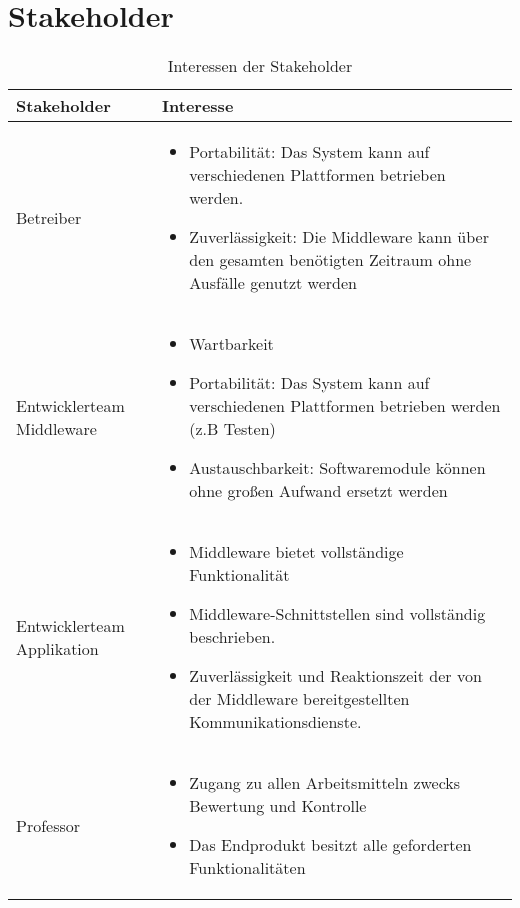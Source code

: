 \section{Stakeholder}
\begin{table}[h!]
	\caption{Interessen der Stakeholder}
	\label{tab:stakeholder}
	\centering
	\begin{tabular}{|p{2.5cm}|p{10cm}|}
		\hline
		\textbf{Stakeholder} & \textbf{Interesse}  \\
		\hline
		Betreiber 
		&\parbox{10cm}{\begin{itemize}
				\item Portabilität: Das System kann auf verschiedenen Plattformen betrieben werden.
				\item Zuverlässigkeit: Die Middleware kann über den gesamten benötigten Zeitraum ohne Ausfälle genutzt werden
		\end{itemize}}
		\\
		\hline
		Entwicklerteam Middleware
		&\parbox{10cm}{ \begin{itemize}
				\item Wartbarkeit
				\item Portabilität: Das System kann auf verschiedenen Plattformen betrieben werden (z.B Testen)
				\item Austauschbarkeit: Softwaremodule können ohne großen Aufwand ersetzt werden
		\end{itemize}}
		\\
		\hline
		Entwicklerteam Applikation
		&\parbox{10cm}{ \begin{itemize}
				\item Middleware bietet vollständige Funktionalität
				\item Middleware-Schnittstellen sind vollständig beschrieben.
				\item Zuverlässigkeit und Reaktionszeit der von der Middleware bereitgestellten Kommunikationsdienste.
		\end{itemize}}
		\\
		\hline
		
		Professor & \parbox{10cm}{\begin{itemize}
				\item Zugang zu allen Arbeitsmitteln zwecks Bewertung und Kontrolle
				\item Das Endprodukt besitzt alle geforderten Funktionalitäten
		\end{itemize}}
		\\
		\hline
	\end{tabular}
\end{table}